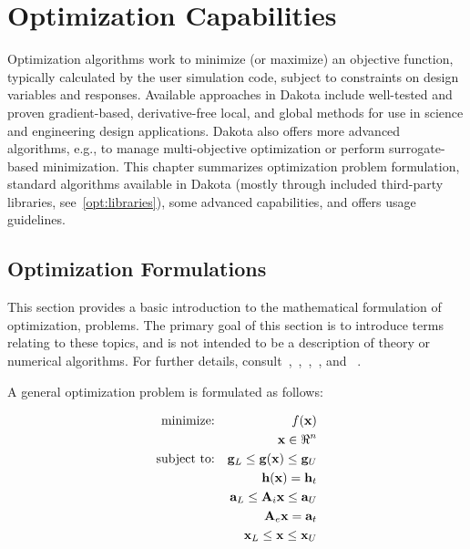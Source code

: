 \chapter{Optimization Capabilities}
\label{opt}

Optimization algorithms work to minimize (or maximize) an objective
function, typically calculated by the user simulation code, subject to
constraints on design variables and responses. Available approaches in
Dakota include well-tested and proven gradient-based, derivative-free
local, and global methods for use in science and engineering design
applications. Dakota also offers more advanced algorithms, e.g., to
manage multi-objective optimization or perform surrogate-based
minimization.  This chapter summarizes optimization problem
formulation, standard algorithms available in Dakota (mostly through
included third-party libraries, see~\ref{opt:libraries}), some
advanced capabilities, and offers usage guidelines.

\section{Optimization Formulations}
\label{opt:formulations}

This section provides a basic introduction to the mathematical
formulation of optimization, problems. The primary goal of this
section is to introduce terms relating to these topics, and is not
intended to be a description of theory or numerical algorithms. For
further details,
consult~\cite{Aro89},~\cite{Gil81},~\cite{Haf92},~\cite{Noc99}, and
~\cite{Van84}.

A general optimization problem is formulated as follows:

\begin{eqnarray}
  \hbox{minimize:} & & f(\mathbf{x})\nonumber\\
  & & \mathbf{x} \in \Re^{n}\nonumber\\
  \hbox{subject to:} & &
  \mathbf{g}_{L} \leq \mathbf{g(x)} \leq \mathbf{g}_U\nonumber\\
  & & \mathbf{h(x)}=\mathbf{h}_{t}\label{opt:formulations:equation01}\\
  & & \mathbf{a}_{L} \leq \mathbf{A}_i\mathbf{x} \leq
  \mathbf{a}_U\nonumber\\
  & & \mathbf{A}_{e}\mathbf{x}=\mathbf{a}_{t}\nonumber\\
  & & \mathbf{x}_{L} \leq \mathbf{x} \leq \mathbf{x}_U\nonumber
\end{eqnarray}

